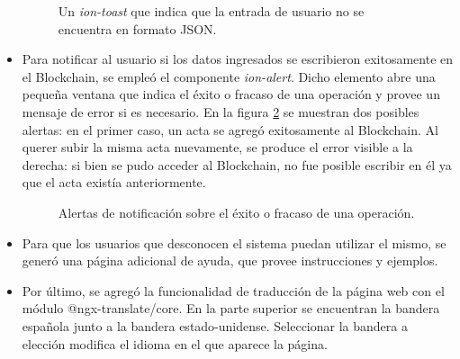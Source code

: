\begin{itemize}
    \begin{figure}[H]
        \caption{Un \textit{ion-toast} que indica que la entrada de usuario no se encuentra en formato JSON.}
        \label{fig:json_toast}
    \end{figure}
    \item Para notificar al usuario si los datos ingresados se escribieron exitosamente en el Blockchain, se empleó el componente \textit{ion-alert}. Dicho elemento abre una pequeña ventana que indica el éxito o fracaso de una operación y provee un mensaje de error si es necesario. En la figura \ref{fig:ion_alert} se muestran dos posibles alertas: en el primer caso, un acta se agregó exitosamente al Blockchain. Al querer subir la misma acta nuevamente, se produce el error visible a la derecha: si bien se pudo acceder al Blockchain, no fue posible escribir en él ya que el acta existía anteriormente.
    \begin{figure}[H]
        \caption{Alertas de notificación sobre el éxito o fracaso de una operación.}
        \label{fig:ion_alert}
    \end{figure}
    \item Para que los usuarios que desconocen el sistema puedan utilizar el mismo, se generó una página adicional de ayuda, que provee instrucciones y ejemplos.
    \item Por último, se agregó la funcionalidad de traducción de la página web con el módulo @ngx-translate/core. En la parte superior se encuentran la bandera española junto a la bandera estado-unidense. Seleccionar la bandera a elección modifica el idioma en el que aparece la página.
\end{itemize}

